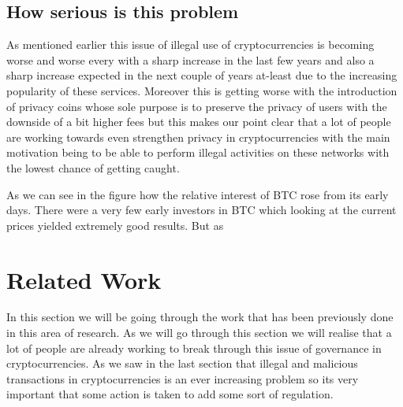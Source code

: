 \documentclass{article}
\begin{document}
\pagebreak

\subsection{How serious is this problem}

As mentioned earlier this issue of illegal use of cryptocurrencies is becoming worse and worse every with a sharp increase in the last few years and also a sharp increase expected in the next couple of years at-least due to the increasing popularity of these services. Moreover this is getting worse with the introduction of privacy coins whose sole purpose is to preserve the privacy of users with the downside of a bit higher fees but this makes our point clear that a lot of people are working towards even strengthen privacy in cryptocurrencies with the main motivation being to be able to perform illegal activities on these networks with the lowest chance of getting caught. 

As we can see in the figure how the relative interest of BTC rose from its early days. There were a very few early investors in BTC which looking at the current prices yielded extremely good results. But as



\cite{kethineni_cao_2019}
\pagebreak
\section{Related Work}
In this section we will be going through the work that has been previously done in this area of research. As we will go through this section we will realise that a lot of people are already working to break through this issue of governance in cryptocurrencies. As we saw in the last section that illegal and malicious transactions in cryptocurrencies is an ever increasing problem so its very important that some action is taken to add some sort of regulation.
\end{document}
